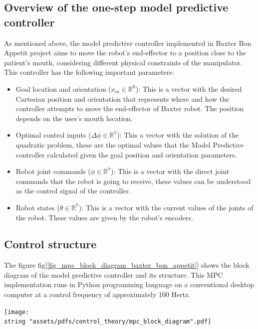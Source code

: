 \documentclass[11pt]{report} %
\begin{document}
\subsection{Overview of the one-step model predictive controller}

As mentioned above, the model predictive controller implemented in Baxter Bon Appetit project aims to move the robot's end-effector to a position close to the patient's mouth, considering different physical constraints of the manipulator.\\

This controller has the following important parameters:

\begin{itemize}
    \item Goal location and orientation ($x_{m} \in \mathbb{R}^6$): This is a vector with the desired Cartesian position and orientation that represents where and how the controller attempts to move the end-effector of Baxter robot. The position depends on the user's mouth location. 
    \item Optimal control inputs ($\Delta\phi \in \mathbb{R}^7$): This a vector with the solution of the quadratic problem, these are the optimal values that the Model Predictive controller calculated given the goal position and orientation parameters.
    \item Robot joint commands ($\phi \in \mathbb{R}^7$): This is a vector with the direct joint commands that the robot is going to receive, these values can be understood as the control signal of the controller.
    \item Robot states ($\theta \in \mathbb{R}^7$): This is a vector with the current values of the joints of the robot. These values are given by the robot's encoders.
\end{itemize}

\subsection{Control structure}

The figure fig[\ref{fig_mpc_block_diagram_baxter_bon_appetit}] shows the block diagram of the model predictive controller and its structure. This MPC implementation runs in Python programming language on a conventional desktop computer at a control frequency of approximately 100 Hertz.\\

\begin{center}
\texttt{[image: \\string "assets/pdfs/control\_theory/mpc\_block\_diagram".pdf]}
\bigbreak
\begin{minipage}{\linewidth} %
\label{fig_mpc_block_diagram_baxter_bon_appetit}
\end{minipage} \end{center}
\end{document}
